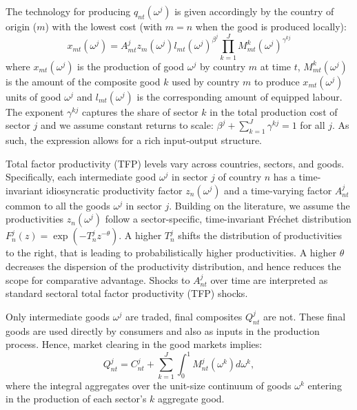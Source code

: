 \documentclass[12pt]{article}
\begin{document}
The technology for producing $q_{nt}(\omega ^{j})$ is given accordingly by
the country of origin ($m$) with the lowest cost (with $m=n$ when the good
is produced locally): 
\begin{equation}
x_{mt}(\omega ^{j})=A_{mt}^{j}z_{m}(\omega ^{j})l_{mt}(\omega ^{j})^{\beta
^{j}}\prod_{k=1}^{J}M_{mt}^{k}(\omega ^{j})^{\gamma ^{kj}}  \label{eqinput}
\end{equation}%
where $x_{mt}(\omega ^{j})$ is the production of good $\omega ^{j}$ by
country $m$ at time $t$, $M_{mt}^{k}(\omega ^{j})$ is the amount of the
composite good $k$ used by country $m$ to produce $x_{mt}(\omega ^{j})$
units of good $\omega ^{j}$ and $l_{mt}(\omega ^{j})$ is the corresponding
amount of equipped labour. The exponent $\gamma ^{kj}$ captures the share of
sector $k$ in the total production cost of sector $j$ and we assume constant
returns to scale: $\beta ^{j}+\sum_{k=1}^{J}\gamma ^{kj}=1$ for all $j$. As
such, the expression allows for a rich input-output structure.

Total factor productivity (TFP) levels vary across countries, sectors, and
goods. Specifically, each intermediate good $\omega ^{j}$ in sector $j$ of
country $n$ has a time-invariant idiosyncratic productivity factor $%
z_{n}(\omega ^{j})$ and a time-varying factor $A_{nt}^{j}$ common to all the
goods $\omega ^{j}$ in sector $j$. Building on the literature, we assume the
productivities $z_{n}(\omega ^{j})$ follow a sector-specific, time-invariant
Fr\'{e}chet distribution $F_{n}^{j}(z)=\exp (-T_{n}^{j}z^{-\theta })$. A
higher $T_{n}^{j}$ shifts the distribution of productivities to the right,
that is leading to probabilistically higher productivities. A higher $\theta 
$ decreases the dispersion of the productivity distribution, and hence
reduces the scope for comparative advantage. Shocks to $A_{nt}^{j}$ over
time are interpreted as standard sectoral total factor productivity (TFP)
shocks.

Only intermediate goods $\omega ^{j}$ are traded, final composites $%
Q_{nt}^{j}$ are not. These final goods are used directly by consumers and
also as inputs in the production process. Hence, market clearing in the good
markets implies: 
\begin{equation*}
Q_{nt}^{j}=C_{nt}^{j}+\sum_{k=1}^{J}\int_{0}^{1}M_{nt}^{j}(\omega
^{k})d\omega ^{k},
\end{equation*}%
where the integral aggregates over the unit-size continuum of goods $\omega
^{k}$ entering in the production of each sector's $k$ aggregate good.
\end{document}
